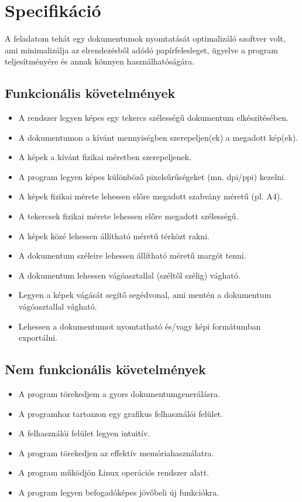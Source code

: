 \chapter{Specifikáció}

A feladatom tehát egy dokumentumok nyomtatását optimalizáló szoftver volt, ami minimalizálja az elrendezésből adódó papírfelesleget, ügyelve a program teljesítményére és annak könnyen használhatóságára.

\section{Funkcionális követelmények}
\begin{itemize}
    \item A rendszer legyen képes egy tekercs szélességű dokumentum elkészítésében.
    \item A dokumentumon a kívánt mennyiségben szerepeljen(ek) a megadott kép(ek).
    \item A képek a kívánt fizikai méretben szerepeljenek.
    \item A program legyen képes különböző pixelsűrűségeket (mn. dpi/ppi) kezelni.
    \item A képek fizikai mérete lehessen előre megadott szabvány méretű (pl. A4).
    \item A tekercsek fizikai mérete lehessen előre megadott szélességű.
    \item A képek közé lehessen állítható méretű térközt rakni.
    \item A dokumentum széleire lehessen állítható méretű margót tenni.
    \item A dokumentum lehessen vágóasztallal (széltől szélig) vágható.
    \item Legyen a képek vágását segítő segédvonal, ami mentén a dokumentum vágóasztallal vágható.
    \item Lehessen a dokumentumot nyomtatható és/vagy képi formátumban exportálni.
\end{itemize}

\section{Nem funkcionális követelmények}
\begin{itemize}
    \item A program törekedjem a gyors dokumentumgenerálásra. 
    \item A programhoz tartozzon egy grafikus felhasználói felület.
    \item A felhasználói felület legyen intuitív.
    \item A program törekedjen az effektív memóriahasználatra.
    \item A program működjön Linux operációs rendszer alatt.
    \item A program legyen befogadóképes jövőbeli új funkciókra.
\end{itemize}